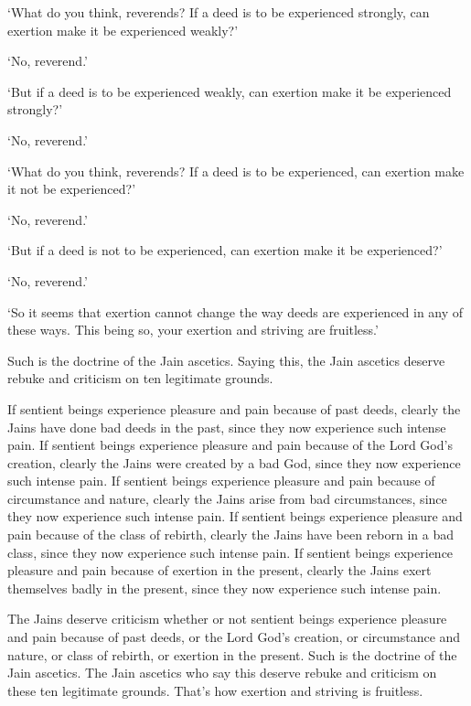 \documentclass[12pt,openany]{book}%
\begin{document}
‘What do you think, reverends? If a deed is to be experienced strongly, can exertion make it be experienced weakly?’ 

‘No, reverend.’ 

‘But if a deed is to be experienced weakly, can exertion make it be experienced strongly?’ 

‘No, reverend.’ 

‘What do you think, reverends? If a deed is to be experienced, can exertion make it not be experienced?’ 

‘No, reverend.’ 

‘But if a deed is not to be experienced, can exertion make it be experienced?’ 

‘No, reverend.’ 

‘So it seems that exertion cannot change the way deeds are experienced in any of these ways. This being so, your exertion and striving are fruitless.’ 

Such is the doctrine of the Jain ascetics. Saying this, the Jain ascetics deserve rebuke and criticism on ten legitimate grounds. 

If sentient beings experience pleasure and pain because of past deeds, clearly the Jains have done bad deeds in the past, since they now experience such intense pain. If sentient beings experience pleasure and pain because of the Lord God’s creation, clearly the Jains were created by a bad God, since they now experience such intense pain. If sentient beings experience pleasure and pain because of circumstance and nature, clearly the Jains arise from bad circumstances, since they now experience such intense pain. If sentient beings experience pleasure and pain because of the class of rebirth, clearly the Jains have been reborn in a bad class, since they now experience such intense pain. If sentient beings experience pleasure and pain because of exertion in the present, clearly the Jains exert themselves badly in the present, since they now experience such intense pain. 

The Jains deserve criticism whether or not sentient beings experience pleasure and pain because of past deeds, or the Lord God’s creation, or circumstance and nature, or class of rebirth, or exertion in the present. Such is the doctrine of the Jain ascetics. The Jain ascetics who say this deserve rebuke and criticism on these ten legitimate grounds. That’s how exertion and striving is fruitless. 
\end{document}
